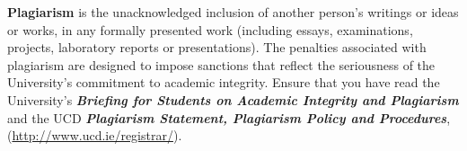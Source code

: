 \textbf{Plagiarism} is the unacknowledged inclusion of another person's writings or ideas or works, in any formally presented work (including essays, examinations, projects, laboratory reports or presentations). The penalties associated with plagiarism are designed to impose sanctions that reflect the seriousness of the University's commitment to academic integrity. Ensure that you have read the University's \textit{\textbf{Briefing for Students on Academic Integrity and Plagiarism}} and the UCD \textit{\textbf{Plagiarism Statement, Plagiarism Policy and Procedures}}, (\href{http://www.ucd.ie/registrar/}{http://www.ucd.ie/registrar/}).\\\\
\noindent{}
\newpage
